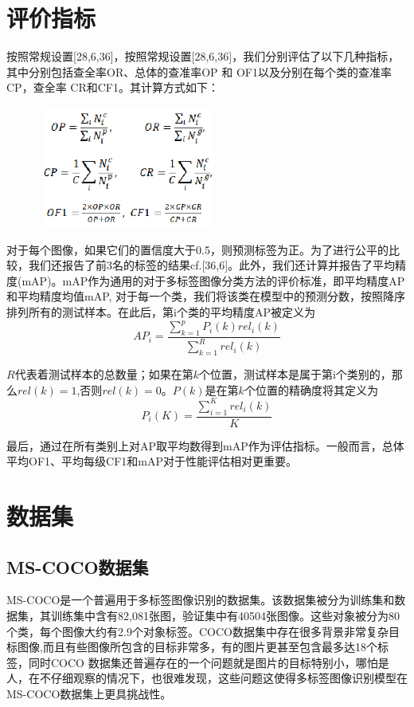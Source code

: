 \section{评价指标}
按照常规设置[28,6,36]，按照常规设置[28,6,36]，我们分别评估了以下几种指标，其中分别包括查全率OR、总体的查准率OP 和 OF1以及分别在每个类的查准率CP，查全率 CR和CF1。其计算方式如下：

\begin{figure}[htbp!]
	\centering
	\includegraphics[width=6cm, height=4cm]{figures/123.png}
	\vspace{-1em}
\end{figure}

对于每个图像，如果它们的置信度大于0.5，则预测标签为正。为了进行公平的比较，我们还报告了前3名的标签的结果cf.[36,6]。此外，我们还计算并报告了平均精度(mAP)。mAP作为通用的对于多标签图像分类方法的评价标准，即平均精度AP和平均精度均值mAP, 对于每一个类，我们将该类在模型中的预测分数，按照降序排列所有的测试样本。在此后，第i个类的平均精度AP被定义为
\begin{equation}
\label{dscNoStgProof0}
AP_i = \frac{\sum_{k=1}^{p}P_i(k)rel_i(k)}{\sum_{k=1}^{R}rel_i(k)}
\end{equation}

$R$代表着测试样本的总数量；如果在第$k$个位置，测试样本是属于第i个类别的，那么$rel(k)=1$,否则$rel(k)=0$。$P(k)$是在第$k$个位置的精确度将其定义为
\begin{equation}
\label{dscNoStgProof0}
P_i(K) = \frac{\sum_{i=1}^{K}rel_i(k)}{K}
\end{equation}

最后，通过在所有类别上对AP取平均数得到mAP作为评估指标。一般而言，总体平均OF1、平均每级CF1和mAP对于性能评估相对更重要。

\section{数据集}

\subsection{MS-COCO数据集}
MS-COCO\cite{Jiang2016CNN}是一个普遍用于多标签图像识别的数据集。该数据集被分为训练集和数据集，其训练集中含有82,081张图，验证集中有40504张图像。这些对象被分为80个类，每个图像大约有2.9个对象标签。COCO数据集中存在很多背景非常复杂目标图像,而且有些图像所包含的目标非常多，有的图片更甚至包含最多达18个标签，同时COCO 数据集还普遍存在的一个问题就是图片的目标特别小，哪怕是人，在不仔细观察的情况下，也很难发现，这些问题这使得多标签图像识别模型在MS-COCO数据集上更具挑战性。


